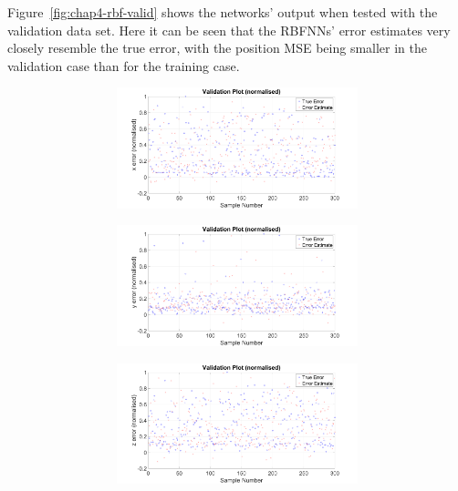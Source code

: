 Figure~\ref{fig:chap4-rbf-valid} shows the networks' output when tested with the validation data set. Here it can be seen that the RBFNNs' error estimates very closely resemble the true error, with the position MSE being smaller in the validation case than for the training case. 

\begin{figure}
  \begin{subfigure}{0.48\textwidth}
    \begin{subfigure}{\textwidth}
      \includegraphics[clip, trim = 80 0 100 0, width=\textwidth]{figures/chapter4/v_x}
    \end{subfigure}
    \begin{subfigure}{\textwidth}
      \includegraphics[clip, trim = 80 0 100 0, width=\textwidth]{figures/chapter4/v_y}
    \end{subfigure}
    \begin{subfigure}{\textwidth}
      \includegraphics[clip, trim = 80 0 100 0, width=\textwidth]{figures/chapter4/v_z}

\end{subfigure}
\end{subfigure}
\end{figure}
